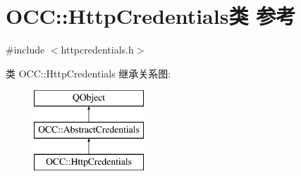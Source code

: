 \hypertarget{class_o_c_c_1_1_http_credentials}{}\section{O\+CC\+:\+:Http\+Credentials类 参考}
\label{class_o_c_c_1_1_http_credentials}


{\ttfamily \#include $<$httpcredentials.\+h$>$}

类 O\+CC\+:\+:Http\+Credentials 继承关系图\+:\begin{figure}[H]
\begin{center}
\leavevmode
\includegraphics[height=3.000000cm]{class_o_c_c_1_1_http_credentials}
\end{center}
\end{figure}
